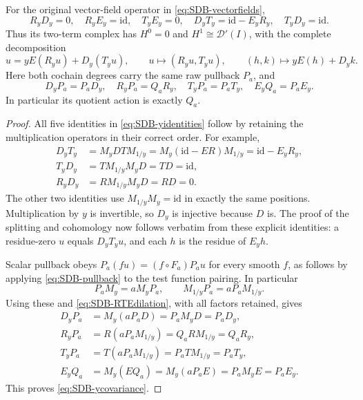 \begin{theorem}
\label{thm:SDB-yexact}
For the original vector-field operator in \eqref{eq:SDB-vectorfields},
\begin{equation}\tag{SDB27}\label{eq:SDB-yidentities}
 R_yD_y=0,\quad R_yE_y=\mathrm{id},\quad T_yE_y=0,\quad
 D_yT_y=\mathrm{id}-E_yR_y,\quad T_yD_y=\mathrm{id}.
\end{equation}
Thus its two-term complex has $H^0=0$ and $H^1\cong\mathcal D'(I)$,
with the complete decomposition
\begin{equation}\tag{SDB28}\label{eq:SDB-ysplitting}
 u=yE(R_yu)+D_y(T_yu),\qquad
 u\longmapsto(R_yu,T_yu),\qquad
 (h,k)\longmapsto yE(h)+D_yk.
\end{equation}
Here both cochain degrees carry the same raw pullback $P_a$, and
\begin{equation}\tag{SDB29}\label{eq:SDB-ycovariance}
 D_yP_a=P_aD_y,\quad R_yP_a=Q_aR_y,\quad
 T_yP_a=P_aT_y,\quad E_yQ_a=P_aE_y.
\end{equation}
In particular its quotient action is exactly $Q_a$.
\end{theorem}
\begin{proof}
All five identities in \eqref{eq:SDB-yidentities} follow by retaining
the multiplication operators in their correct order. For example,
\[
 \begin{aligned}
 D_yT_y
 &=M_yDTM_{1/y}
   =M_y(\mathrm{id}-ER)M_{1/y}
   =\mathrm{id}-E_yR_y,\\
 T_yD_y&=TM_{1/y}M_yD=TD=\mathrm{id},\\
 R_yD_y&=RM_{1/y}M_yD=RD=0.
 \end{aligned}
\]
The other two identities use $M_{1/y}M_y=\mathrm{id}$ in exactly
the same positions. Multiplication by $y$ is invertible, so $D_y$
is injective because $D$ is. The proof of the splitting and cohomology
now follows verbatim from these explicit identities: a residue-zero
$u$ equals $D_yT_yu$, and each $h$ is the residue of $E_yh$.

Scalar pullback obeys $P_a(fu)=(f\circ F_a)P_au$ for every smooth
$f$, as follows by applying \eqref{eq:SDB-pullback} to the test
function pairing. In particular
\begin{equation}\tag{SDB30}\label{eq:SDB-multiplicationcovariance}
 P_aM_y=aM_yP_a,\qquad
 M_{1/y}P_a=aP_aM_{1/y}.
\end{equation}
Using these and \eqref{eq:SDB-RTEdilation}, with all factors retained,
gives
\[
 \begin{aligned}
 D_yP_a&=M_y(aP_aD)=P_aM_yD=P_aD_y,\\
 R_yP_a&=R(aP_aM_{1/y})=Q_aRM_{1/y}=Q_aR_y,\\
 T_yP_a&=T(aP_aM_{1/y})=P_aTM_{1/y}=P_aT_y,\\
 E_yQ_a&=M_y(EQ_a)=M_y(aP_aE)=P_aM_yE=P_aE_y.
 \end{aligned}
\]
This proves \eqref{eq:SDB-ycovariance}.
\end{proof}

